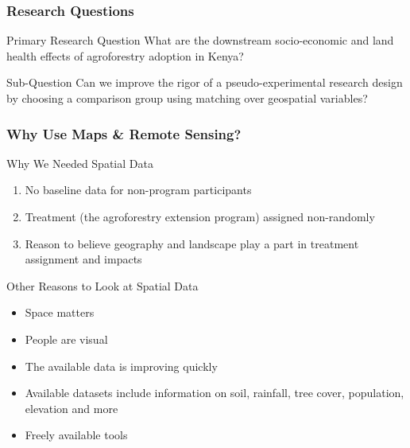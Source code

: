 \documentclass{beamer}
\begin{document}
\begin{frame}
\frametitle{Research Questions}

\begin{block}{Primary Research Question}
What are the downstream socio-economic and land health effects of agroforestry adoption in Kenya?
\end{block}

\begin{block}{Sub-Question}
Can we improve the rigor of a pseudo-experimental research design by choosing a comparison group using matching over geospatial variables?
\end{block}

\end{frame}

\begin{frame}
\frametitle{Why Use Maps \& Remote Sensing?}

\begin{block}{Why We Needed Spatial Data}
 \begin{enumerate}
  \item No baseline data for non-program participants
  \item Treatment (the agroforestry extension program) assigned non-randomly
  \item Reason to believe geography and landscape play a part in treatment assignment and impacts
 \end{enumerate}
\end{block}
\pause

\begin{block}{Other Reasons to Look at Spatial Data}
\begin{itemize}
\item Space matters
\item People are visual
\item The available data is improving quickly
\item Available datasets include information on soil, rainfall, tree cover, population, elevation and more
\item Freely available tools
\end{itemize}
\end{block}
\end{frame}
\end{document}

